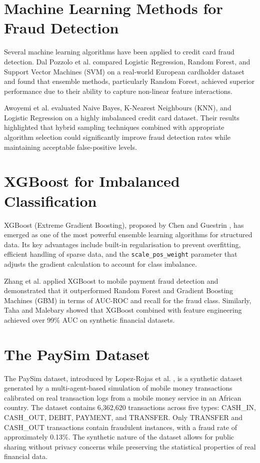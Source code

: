 \documentclass[12pt,a4paper]{report}
\begin{document}
\section{Machine Learning Methods for Fraud Detection}

Several machine learning algorithms have been applied to credit card fraud detection. Dal Pozzolo et al. \cite{dal2014learned} compared Logistic Regression, Random Forest, and Support Vector Machines (SVM) on a real-world European cardholder dataset and found that ensemble methods, particularly Random Forest, achieved superior performance due to their ability to capture non-linear feature interactions.

Awoyemi et al. \cite{awoyemi2017credit} evaluated Naive Bayes, K-Nearest Neighbours (KNN), and Logistic Regression on a highly imbalanced credit card dataset. Their results highlighted that hybrid sampling techniques combined with appropriate algorithm selection could significantly improve fraud detection rates while maintaining acceptable false-positive levels.

\section{XGBoost for Imbalanced Classification}

XGBoost (Extreme Gradient Boosting), proposed by Chen and Guestrin \cite{chen2016xgboost}, has emerged as one of the most powerful ensemble learning algorithms for structured data. Its key advantages include built-in regularisation to prevent overfitting, efficient handling of sparse data, and the \texttt{scale\_pos\_weight} parameter that adjusts the gradient calculation to account for class imbalance.

Zhang et al. \cite{zhang2019fraud} applied XGBoost to mobile payment fraud detection and demonstrated that it outperformed Random Forest and Gradient Boosting Machines (GBM) in terms of AUC-ROC and recall for the fraud class. Similarly, Taha and Malebary \cite{taha2020intelligent} showed that XGBoost combined with feature engineering achieved over 99\% AUC on synthetic financial datasets.

\section{The PaySim Dataset}

The PaySim dataset, introduced by Lopez-Rojas et al. \cite{lopezrojas2016paysim}, is a synthetic dataset generated by a multi-agent-based simulation of mobile money transactions calibrated on real transaction logs from a mobile money service in an African country. The dataset contains 6,362,620 transactions across five types: CASH\_IN, CASH\_OUT, DEBIT, PAYMENT, and TRANSFER. Only TRANSFER and CASH\_OUT transactions contain fraudulent instances, with a fraud rate of approximately 0.13\%. The synthetic nature of the dataset allows for public sharing without privacy concerns while preserving the statistical properties of real financial data.
\end{document}
